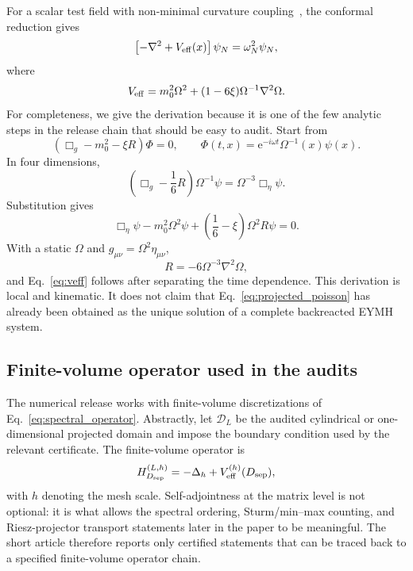 \documentclass[11pt,a4paper]{article}
\newcommand{\ee}{\mathrm{e}}
\newcommand{\Dsep}{D_{\rm sep}}
\begin{document}
For a scalar test field with non-minimal curvature coupling~\cite{BirrellDavies1982}, the conformal reduction gives
\begin{equation}
    \left[-\nabla^2+V_{\rm eff}(x)\right]\psi_N=\omega_N^2\psi_N,
    \label{eq:spectral_operator}
\end{equation}
where
\begin{equation}
    V_{\rm eff}=m_0^2\Omega^2+(1-6\xi)\Omega^{-1}\nabla^2\Omega.
    \label{eq:veff}
\end{equation}
For completeness, we give the derivation because it is one of the few analytic steps in the release chain that should be easy to audit.
Start from
\begin{equation}
    (\Box_g-m_0^2-\xi R)\Phi=0,\qquad
    \Phi(t,x)=\ee^{-i\omega t}\Omega^{-1}(x)\psi(x).
\end{equation}
In four dimensions,
\begin{equation}
    \left(\Box_g-\frac{1}{6}R\right)\Omega^{-1}\psi
    =
    \Omega^{-3}\Box_\eta\psi.
    \label{eq:conformal_identity}
\end{equation}
Substitution gives
\begin{equation}
    \Box_\eta\psi-m_0^2\Omega^2\psi+\left(\frac{1}{6}-\xi\right)\Omega^2R\psi=0.
\end{equation}
With a static \(\Omega\) and \(g_{\mu\nu}=\Omega^2\eta_{\mu\nu}\),
\begin{equation}
    R=-6\Omega^{-3}\nabla^2\Omega,
\end{equation}
and Eq.~\eqref{eq:veff} follows after separating the time dependence.
This derivation is local and kinematic.
It does not claim that Eq.~\eqref{eq:projected_poisson} has already been obtained as the unique solution of a complete backreacted EYMH system.

\subsection{Finite-volume operator used in the audits}

The numerical release works with finite-volume discretizations of Eq.~\eqref{eq:spectral_operator}.
Abstractly, let \(\mathcal D_L\) be the audited cylindrical or one-dimensional projected domain and impose the boundary condition used by the relevant certificate.
The finite-volume operator is
\begin{equation}
    H_{\Dsep}^{(L,h)}
    =
    -\Delta_h+V_{\rm eff}^{(h)}(\Dsep),
    \label{eq:finite_volume_operator}
\end{equation}
with \(h\) denoting the mesh scale.
Self-adjointness at the matrix level is not optional: it is what allows the spectral ordering, Sturm/min--max counting, and Riesz-projector transport statements later in the paper to be meaningful.
The short article therefore reports only certified statements that can be traced back to a specified finite-volume operator chain.
\end{document}
